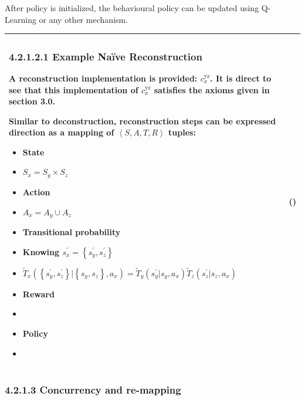 \documentclass[]{article}
\begin{document}
After policy is initialized, the behavioural policy can be updated using
Q-Learning or any other mechanism.

\begin{longtable}[]{@{}ll@{}}
\toprule
\begin{minipage}[t]{0.48\columnwidth}\raggedright\strut
\subsubsection{4.2.1.2.1 Example Naïve
Reconstruction}\label{example-nauxefve-reconstruction}

A reconstruction implementation is provided: \(c_{x}^{\text{yz}}\). It
is direct to see that this implementation of \(c_{x}^{\text{yz}}\)
satisfies the axioms given in section 3.0.

Similar to deconstruction, reconstruction steps can be expressed
direction as a mapping of \(\left\langle S,A,T,R \right\rangle\) tuples:

\begin{itemize}
\item
  State
\item
  \(S_{x} = S_{y} \times S_{z}\)
\item
  Action
\item
  \(A_{x} = A_{y} \cup A_{z}\)
\item
  Transitional probability
\item
  Knowing \(s_{x}^{'} = \left\{ s_{y}^{'},s_{z}^{'} \right\}\)
\item
  \({\tilde{T}}_{x}\left( \left\{ s_{y}^{'},s_{z}^{'} \right\}|\left\{ s_{y}^{\ },s_{z}^{\ } \right\},a_{x} \right) = {\tilde{T}}_{y}\left( s_{y}^{'}|s_{y}^{\ },a_{x} \right){\tilde{T}}_{z}\left( s_{z}^{'}|s_{z}^{\ },a_{x} \right)\)
\item
  Reward
\item
\item
  Policy
\item
\end{itemize}\strut
\end{minipage} & \begin{minipage}[t]{0.48\columnwidth}\raggedright\strut
()\strut
\end{minipage}\tabularnewline
\bottomrule
\end{longtable}

\subsubsection{4.2.1.3 Concurrency and
re-mapping}\label{concurrency-and-re-mapping}
\end{document}
